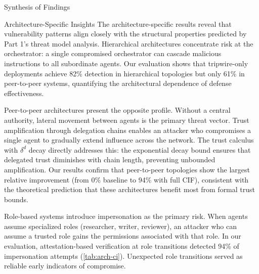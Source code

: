 \documentclass[
  ignorenonframetext,
]{beamer}
\begin{document}
\begin{frame}{Synthesis of Findings}
\begin{block}{Architecture-Specific Insights}
The architecture-specific results reveal that vulnerability patterns
align closely with the structural properties predicted by Part 1's
threat model analysis. Hierarchical architectures concentrate risk at
the orchestrator: a single compromised orchestrator can cascade
malicious instructions to all subordinate agents. Our evaluation shows
that tripwire-only deployments achieve 82\% detection in hierarchical
topologies but only 61\% in peer-to-peer systems, quantifying the
architectural dependence of defense effectiveness.

Peer-to-peer architectures present the opposite profile. Without a
central authority, lateral movement between agents is the primary threat
vector. Trust amplification through delegation chains enables an
attacker who compromises a single agent to gradually extend influence
across the network. The trust calculus with \(\delta^d\) decay directly
addresses this: the exponential decay bound ensures that delegated trust
diminishes with chain length, preventing unbounded amplification. Our
results confirm that peer-to-peer topologies show the largest relative
improvement (from 0\% baseline to 94\% with full CIF), consistent with
the theoretical prediction that these architectures benefit most from
formal trust bounds.

Role-based systems introduce impersonation as the primary risk. When
agents assume specialized roles (researcher, writer, reviewer), an
attacker who can assume a trusted role gains the permissions associated
with that role. In our evaluation, attestation-based verification at
role transitions detected 94\% of impersonation attempts
(\cref{tab:arch-ci}). Unexpected role transitions served as reliable
early indicators of compromise.
\end{block}
\end{frame}
\end{document}
